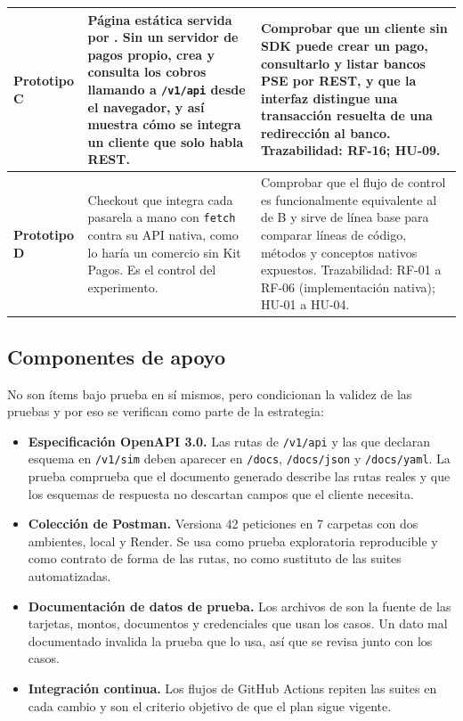 {\begin{xltabular}{\textwidth}{|>{\raggedright\arraybackslash}p{3.1cm}|>{\raggedright\arraybackslash}X|>{\raggedright\arraybackslash}X|}
\textbf{Prototipo C} \newline {} &
Página estática servida por . Sin un servidor de pagos propio, crea y consulta los cobros llamando a \texttt{/v1/api} desde el navegador, y así muestra cómo se integra un cliente que solo habla REST. &
Comprobar que un cliente sin SDK puede crear un pago, consultarlo y listar bancos PSE por REST, y que la interfaz distingue una transacción resuelta de una redirección al banco. Trazabilidad: RF-16; HU-09. \\ \hline
\textbf{Prototipo D} \newline {} &
Checkout que integra cada pasarela a mano con \texttt{fetch} contra su API nativa, como lo haría un comercio sin Kit Pagos. Es el control del experimento. &
Comprobar que el flujo de control es funcionalmente equivalente al de B y sirve de línea base para comparar líneas de código, métodos y conceptos nativos expuestos. Trazabilidad: RF-01 a RF-06 (implementación nativa); HU-01 a HU-04. \\ \hline
\end{xltabular}
}

\subsection{Componentes de apoyo}

No son ítems bajo prueba en sí mismos, pero condicionan la validez de las pruebas y por eso se verifican como parte de la estrategia:

\begin{itemize}
  \item \textbf{Especificación OpenAPI 3.0.} Las rutas de \texttt{/v1/api} y las que declaran esquema en \texttt{/v1/sim} deben aparecer en \texttt{/docs}, \texttt{/docs/json} y \texttt{/docs/yaml}. La prueba comprueba que el documento generado describe las rutas reales y que los esquemas de respuesta no descartan campos que el cliente necesita.
  \item \textbf{Colección de Postman.} Versiona 42 peticiones en 7 carpetas con dos ambientes, local y Render. Se usa como prueba exploratoria reproducible y como contrato de forma de las rutas, no como sustituto de las suites automatizadas.
  \item \textbf{Documentación de datos de prueba.} Los archivos de  son la fuente de las tarjetas, montos, documentos y credenciales que usan los casos. Un dato mal documentado invalida la prueba que lo usa, así que se revisa junto con los casos.
  \item \textbf{Integración continua.} Los flujos de GitHub Actions repiten las suites en cada cambio y son el criterio objetivo de que el plan sigue vigente.
\end{itemize}

